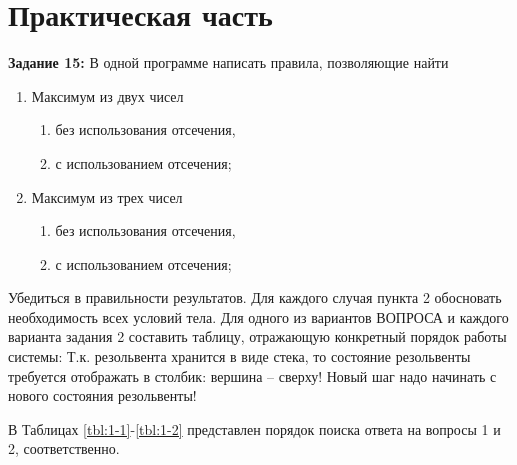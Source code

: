 \chapter{Практическая часть}

\textbf{Задание 15:} В одной программе написать правила, позволяющие найти
\begin{enumerate}
    \item Максимум из двух чисел
    \begin{enumerate}
        \item без использования отсечения,
        \item с использованием отсечения;
    \end{enumerate}
    \item Максимум из трех чисел
    \begin{enumerate}
        \item без использования отсечения,
        \item с использованием отсечения;
    \end{enumerate}
\end{enumerate}

Убедиться в правильности результатов.
Для каждого случая пункта 2 обосновать необходимость всех условий тела.
Для одного из вариантов ВОПРОСА и каждого варианта задания 2 составить
таблицу, отражающую конкретный порядок работы системы:
Т.к. резольвента хранится в виде стека, то состояние резольвенты требуется
отображать в столбик: вершина – сверху! Новый шаг надо начинать с нового
состояния резольвенты!

\clearpage


В Таблицах \ref{tbl:1-1}-\ref{tbl:1-2} представлен порядок поиска ответа на вопросы 1 и 2, соответственно.


